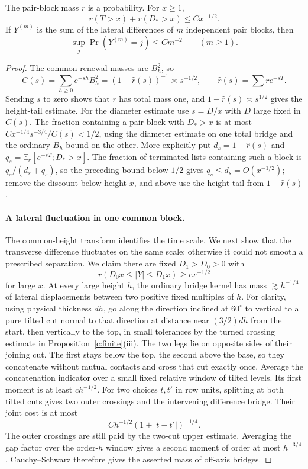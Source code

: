 \begin{lemma}\label{c:pair-block-estimates}
The pair-block mass $r$ is a probability. For $x\ge1$,
\[
 r(T>x)+r(D_*>x)\le Cx^{-1/2}.
\]
If $Y^{(m)}$ is the sum of the lateral differences of $m$ independent
pair blocks, then
\[
 \sup_j\Pr(Y^{(m)}=j)\le Cm^{-2}\qquad(m\ge1).
\]
\end{lemma}
\begin{proof}
The common renewal masses are $B_h^2$, so
\[
 C(s)=\sum_{h\ge0}e^{-s h}B_h^2=(1-\hat r(s))^{-1}\asymp s^{-1/2},\qquad
 \hat r(s)=\sum r e^{-sT}.
\]
Sending $s$ to zero shows that $r$ has total mass one, and
$1-\hat r(s)\asymp s^{1/2}$ gives the height-tail estimate.
For the diameter estimate use \(s=D/x\) with \(D\) large fixed in \(C(s)\). The fraction containing a pair-block with \(D_*>x\) is at most \(C x^{-1/4}s^{-3/4}/C(s)<1/2\), using the diameter estimate on one total bridge and the ordinary \(B_h\) bound on the other. More explicitly put $d_s=1-\hat r(s)$ and $q_s=\mathbb E_r[e^{-sT};D_*>x]$. The fraction of terminated lists containing such a block is $q_s/(d_s+q_s)$, so the preceding bound below $1/2$ gives $q_s\le d_s=O(x^{-1/2})$; remove the discount below height \(x\), and above use the height tail from \(1-\hat r(s)\).



\paragraph{A lateral fluctuation in one common block.}
The common-height transform identifies the time scale. We next show that
the transverse difference fluctuates on the same scale; otherwise it
could not smooth a prescribed separation. We claim there are fixed \(D_1>D_0>0\) with
\[
 r(D_0 x\le |Y|\le D_1 x)\ge c x^{-1/2}
\]
for large \(x\). At every large height \(h\), the ordinary bridge kernel has mass \(\gtrsim h^{-1/4}\) of lateral displacements between two positive fixed multiples of \(h\). For clarity, using physical thickness \(d h\), go along the direction inclined at \(60^\circ\) to vertical to a pure tilted cut normal to that direction at distance near \((3/2)d h\) from the start, then vertically to the top, in small tolerances by the turned crossing estimate in Proposition~\ref{c:finite}(iii). The two legs lie on opposite sides of their joining cut. The first stays below the top, the second above the base, so they concatenate without mutual contacts and cross that cut exactly once. Average the concatenation indicator over a small fixed relative window of tilted levels. Its first moment is at least $ch^{-1/2}$. For two choices $t,t'$ in row units, splitting at both tilted cuts gives two outer crossings and the intervening difference bridge. Their joint cost is at most
\[
 Ch^{-1/2}(1+|t-t'|)^{-1/4}.
\]
The outer crossings are still paid by the two-cut upper estimate.
Averaging the gap factor over the order-$h$ window gives a second moment
of order at most $h^{-3/4}$. Cauchy--Schwarz therefore gives the asserted
mass of off-axis bridges.




\end{proof}
